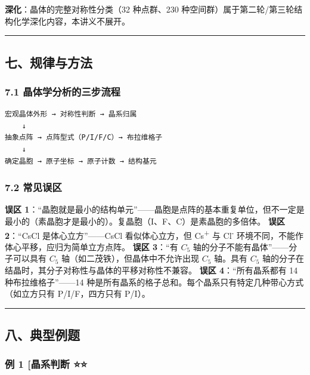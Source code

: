 \documentclass[a4paper,11pt]{ctexart}
\begin{document}
\textbf{深化}：晶体的完整对称性分类（32 种点群、230 种空间群）属于第二轮/第三轮结构化学深化内容，本讲义不展开。

\begin{center}\rule{0.5\linewidth}{0.5pt}\end{center}

\subsection{七、规律与方法}\label{ux4e03ux89c4ux5f8bux4e0eux65b9ux6cd5}

\subsubsection{7.1 晶体学分析的三步流程}\label{ux6676ux4f53ux5b66ux5206ux6790ux7684ux4e09ux6b65ux6d41ux7a0b}

\begin{verbatim}
宏观晶体外形 → 对称性判断 → 晶系归属
    ↓
抽象点阵 → 点阵型式（P/I/F/C）→ 布拉维格子
    ↓
确定晶胞 → 原子坐标 → 原子计数 → 结构基元
\end{verbatim}

\subsubsection{7.2 常见误区}\label{ux5e38ux89c1ux8befux533a}

\textbf{误区 1}：``晶胞就是最小的结构单元''------晶胞是点阵的基本重复单位，但不一定是最小的（素晶胞才是最小的）。复晶胞（I、F、C）是素晶胞的多倍体。
\textbf{误区 2}：``CsCl 是体心立方''------CsCl 看似体心立方，但 Cs\textsuperscript{+} 与 Cl\textsuperscript{-} 环境不同，不能作体心平移，应归为简单立方点阵。
\textbf{误区 3}：``有 \(C_5\) 轴的分子不能有晶体''------分子可以具有 \(C_5\) 轴（如二茂铁），但晶体中不允许出现 \(C_5\) 轴。具有 \(C_5\) 轴的分子在结晶时，其分子对称性与晶体的平移对称性不兼容。
\textbf{误区 4}：``所有晶系都有 14 种布拉维格子''------14 种是所有晶系的格子总和。每个晶系只有特定几种带心方式（如立方只有 P/I/F，四方只有 P/I）。

\begin{center}\rule{0.5\linewidth}{0.5pt}\end{center}

\subsection{八、典型例题}\label{ux516bux5178ux578bux4f8bux9898}

\subsubsection{例 1 {[}晶系判断 ⭐⭐}\label{ux4f8b-1-ux6676ux7cfbux5224ux65ad}
\end{document}
